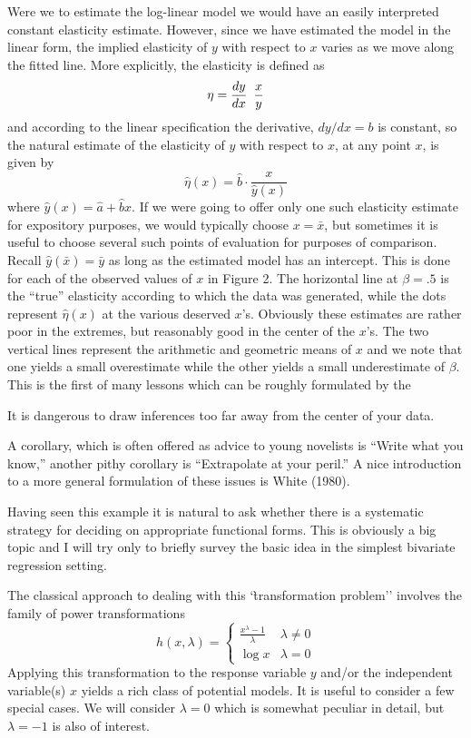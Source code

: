 \documentclass[11pt]{amsbook}
\begin{document}
Were we to estimate the log-linear model we would have an easily 
interpreted constant elasticity estimate.  However, since we have estimated 
the model in the linear form, the implied elasticity of $y$ with respect to $x$
varies as we move along the fitted line.  More explicitly, the elasticity is 
defined as
$$
\eta = \frac{dy}{dx} \enskip \frac{x}{y}
$$
and according to the linear specification the derivative, $dy/dx = b$ 
is constant, so the natural estimate of the elasticity of $y$ with 
respect to $x$, at any point $x$, is given by
$$
\hat\eta(x) = \hat b \cdot \frac{x}{\hat y(x)}
$$
where $\hat y(x) = \hat a + \hat b x.$  If we were going to offer 
only one such elasticity estimate for expository purposes, we would typically
choose $x = \bar x$, but sometimes it is useful to choose several such points
of evaluation for purposes of comparison.  Recall $\hat y (\bar x) = \bar y$
as long as the estimated model has an intercept. This is done for each of 
the observed values of $x $ in Figure 2.  The horizontal line at 
$\beta =.5$ is the ``true'' elasticity according to which the data 
was generated, while the dots represent $\hat\eta(x)$ at 
the various deserved $x$'s.  Obviously these estimates are rather poor
in the extremes, but reasonably good in the center of the $x$'s.  
The two vertical lines represent the arithmetic and geometric means of $x$
and we note that one yields a small overestimate while the other
yields a small underestimate of $\beta$.  This is the first of many lessons
which can be roughly formulated by the 

\vspace{5mm}
  It is dangerous to draw inferences too far away 
from the center of your data.

A corollary, which is often offered as advice to young novelists is 
``Write what you know,'' another pithy corollary is ``Extrapolate at your 
peril.''  A nice introduction to a more general formulation of these
issues is White (1980).

Having seen this example it is natural to ask whether there is a 
systematic strategy for deciding on appropriate functional forms.  This is 
obviously a big topic and I will try only to briefly survey the basic
idea in the simplest bivariate regression setting.

The classical approach to dealing with this `\`transformation problem'' 
involves the family of power transformations
$$
h(x, \lambda) = \left\{ \begin{array}{cl}
\frac{x^\lambda-1}{\lambda} & \lambda \neq 0\\
\log x & \lambda=0
\end{array} \right.
$$
Applying this transformation to the response variable $y$ and/or the
independent variable(s) $x$ yields a rich class of  potential models.
It is useful to consider a few special cases.  We will consider 
$\lambda = 0$ which is somewhat peculiar in detail, but $\lambda = -1$
is also of interest.
\end{document}
